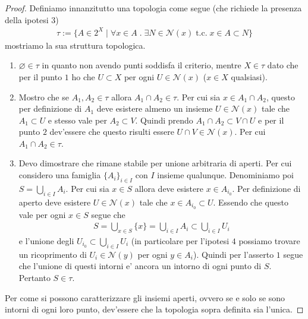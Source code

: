 \begin{proof}
	Definiamo innanzitutto una topologia come segue (che richiede la presenza della ipotesi $3$)
	\begin{equation}
	\begin{aligned}
		\tau := \{ A \in 2^X \; |\; \forall x \in A \; . \; \exists N \in \mathcal{N}(x) \; \text{t.c.} \; x \in A \subset N\}
	\end{aligned}
	\end{equation}
	mostriamo la sua struttura topologica.
	\begin{enumerate}
		\item $\varnothing \in \tau$ in quanto non avendo punti soddisfa il criterio, mentre $X \in \tau$ dato che per il punto $1$ ho che $U \subset X$ per ogni $U \in \mathcal{N}(x)$ ($x \in X$ qualsiasi).
		\item Mostro che se $A_1, A_2 \in \tau$ allora $A_1 \cap A_2 \in \tau$. Per cui sia $x \in A_1 \cap A_2$, questo per definizione di $A_1$ deve esistere almeno un insieme $U \in \mathcal{N}(x)$ tale che $A_1\subset U$ e stesso vale per $A_2 \subset V$. Quindi prendo $A_1 \cap A_2 \subset V \cap U$ e per il punto $2$ dev'essere che questo risulti essere $U \cap V \in \mathcal{N}(x)$. Per cui $A_1 \cap A_2 \in \tau$.
		\item Devo dimostrare che rimane stabile per unione arbitraria di aperti. Per cui considero una famiglia $\{A_i\}_{i \in I}$ con $I$ insieme qualunque. Denominiamo poi $S = \bigcup_{i \in I} A_i$. Per cui sia $x \in S$ allora deve esistere $x \in A_{i_0}$. Per definizione di aperto deve esistere $U\in \mathcal{N}(x)$ tale che $x \in A_{i_0} \subset U$. Essendo che questo vale per ogni $x \in S$ segue che
		\begin{equation}
		\begin{aligned}
			S = \bigcup_{x \in S} \{x\} = \bigcup_{i \in I} A_i \subset \bigcup_{i \in I} U_i
		\end{aligned}
		\end{equation}
		e l'unione degli $U_{i_0} \subset \bigcup_{i \in I} U_i$ (in particolare per l'ipotesi $4$ possiamo trovare un ricoprimento di $U_i \in \mathcal{N}(y)$ per ogni $y \in A_i$). Quindi per l'asserto $1$ segue che l'unione di questi intorni e' ancora un intorno di ogni punto di $S$. Pertanto $S \in \tau$.
	\end{enumerate}
	Per come si possono caratterizzare gli insiemi aperti, ovvero se e solo se sono intorni di ogni loro punto, dev'essere che la topologia sopra definita sia l'unica.  
\end{proof}

